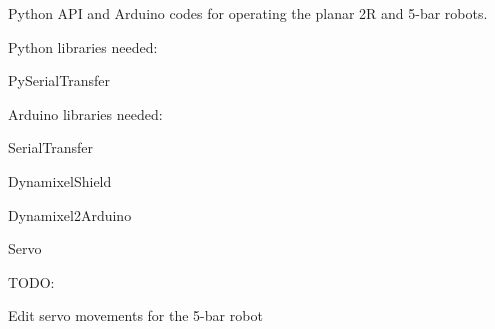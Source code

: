 Python API and Arduino codes for operating the planar 2R and 5-\/bar robots.

Python libraries needed\+:
\begin{DoxyEnumerate}
\item Py\+Serial\+Transfer 
\begin{DoxyCode}{0}

\end{DoxyCode}

\end{DoxyEnumerate}

Arduino libraries needed\+:
\begin{DoxyEnumerate}
\item Serial\+Transfer
\item Dynamixel\+Shield
\item Dynamixel2\+Arduino
\item Servo
\end{DoxyEnumerate}

TODO\+:
\begin{DoxyEnumerate}
\item Edit servo movements for the 5-\/bar robot 
\end{DoxyEnumerate}